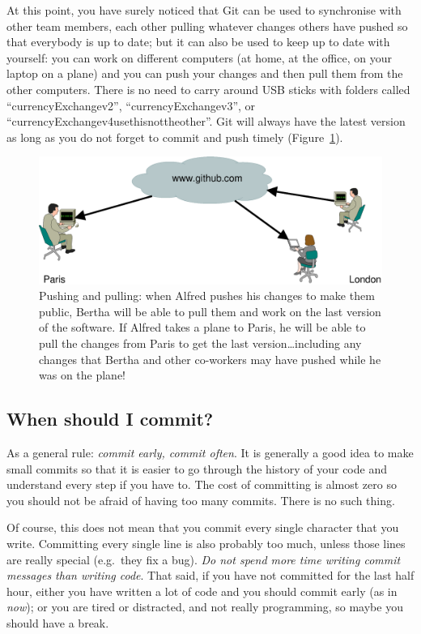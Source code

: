 At this point, you have surely noticed that Git can be used to
synchronise with other team members, each other pulling whatever
changes others have pushed so that everybody is up to date; but it can
also be used to keep up to date with yourself: you can work on
different computers (at home, at the office, on your laptop on a
plane) and you can push your changes and then pull them from the other
computers. There is no need to carry around USB sticks with folders
called ``currencyExchangev2'', ``currencyExchangev3'', or
``currencyExchangev4usethisnottheother''. Git will always have the
latest version as long as you do not forget to commit and push
timely (Figure~\ref{fig:pushpull}). 

\begin{figure}[htbp!]
  \centering
  \includegraphics[width=\textwidth]{gfx/pushpull}
  \caption{Pushing and pulling: when Alfred pushes his changes to make
    them public, Bertha will be able to pull them and work on the last
    version of the software. If Alfred takes a plane to Paris, he will
    be able to pull the changes from Paris to get the last
    version\ldots including any changes that Bertha and other
    co-workers may have pushed while he was on the plane!}
  \label{fig:pushpull}
\end{figure}

\subsection{When should I commit?}
\label{sec:when-should-i}

As a general rule: \emph{commit early, commit often}. It is generally
a good idea to make small commits so that it is easier to go through
the history of your code and understand every step if you have to. The
cost of 
committing is almost zero so you should not be afraid of having too
many commits. There is no such thing. 

Of course, this does not mean that you commit every single character
that you write. Committing every single line is also probably too
much, unless those lines are really special (e.g.~they fix a bug). 
\emph{Do not spend more time
writing commit messages than writing code}. That said, if you have not
committed for the last half hour, either you have written a lot of
code and you should commit early (as in \emph{now}); or you are tired
or distracted, and not really programming, so maybe you should have a
break.

